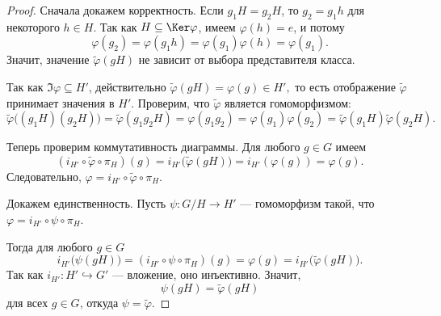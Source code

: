 \begin{proof}
	Сначала докажем корректность.
	Если $g_1H=g_2H$, то $g_2=g_1h$ для некоторого $h\in H$. Так как
	$H\subseteq \Ker\varphi$, имеем $\varphi(h)=e$, и потому
	\[
	\varphi(g_2)=\varphi(g_1h)=\varphi(g_1)\varphi(h)=\varphi(g_1).
	\]
	Значит, значение $\widetilde\varphi(gH)$ не зависит от выбора представителя класса.

	Так как $\Im\varphi\subseteq H'$, действительно $\widetilde\varphi(gH)=\varphi(g)\in H',$ то есть отображение $\widetilde\varphi$ принимает значения в $H'$. Проверим, что $\widetilde\varphi$ является гомоморфизмом:
	\[
	\widetilde\varphi\bigl((g_1H)(g_2H)\bigr)
	=
	\widetilde\varphi(g_1g_2H)
	=
	\varphi(g_1g_2)
	=
	\varphi(g_1)\varphi(g_2)
	=
	\widetilde\varphi(g_1H)\widetilde\varphi(g_2H).
	\]

	Теперь проверим коммутативность диаграммы. Для любого $g\in G$ имеем
	\[
	(i_{H'}\circ \widetilde\varphi\circ \pi_H)(g)
	=
	i_{H'}\bigl(\widetilde\varphi(gH)\bigr)
	=
	i_{H'}(\varphi(g))
	=
	\varphi(g).
	\]
	Следовательно, 	$\varphi = i_{H'}\circ \widetilde\varphi\circ \pi_H.$

	Докажем единственность. Пусть $\psi\colon G/H\to H'$ --- гомоморфизм такой, что $\varphi = i_{H'}\circ \psi\circ \pi_H.$

	Тогда для любого $g\in G$
	\[
	i_{H'}\bigl(\psi(gH)\bigr)
	=
	(i_{H'}\circ \psi\circ \pi_H)(g)
	=
	\varphi(g)
	=
	i_{H'}\bigl(\widetilde\varphi(gH)\bigr).
	\]
	Так как $i_{H'}\colon H'\hookrightarrow G'$ --- вложение, оно инъективно. Значит,
	\[
	\psi(gH)=\widetilde\varphi(gH)
	\]
	для всех $g\in G$, откуда $\psi=\widetilde\varphi$.
\end{proof}
